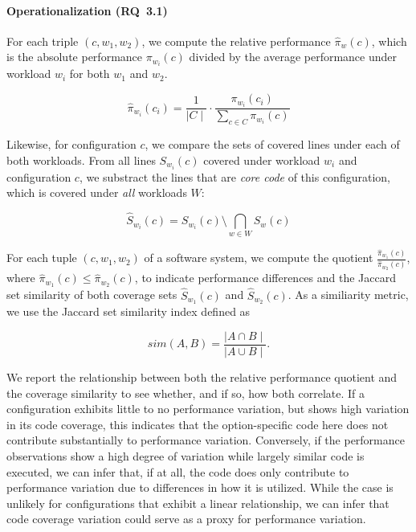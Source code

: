 

\paragraph*{Operationalization (RQ~3.1)} For each triple $(c, w_1, w_2)$, we compute the relative performance $\hat{\pi}_{w}(c)$, which is the absolute performance $\pi_{w_i}(c)$ divided by the average performance under workload $w_i$ for both $w_1$ and $w_2$. 

\begin{equation}
	\hat{\pi}_{w_i}(c_i) =  \frac{1}{\mid C \mid} \cdot \frac{\pi_{w_i}(c_i)}{\sum_{c\in C} \pi_{w_i}(c)}
\end{equation}

Likewise, for configuration $c$, we compare the sets of covered lines under each of both workloads. From all lines $S_{w_i}(c)$ covered under workload $w_i$ and configuration $c$, we substract the lines that are \emph{core code} of this configuration, which is covered under \emph{all} workloads $W$:

\begin{equation}
\hat{S}_{w_i}(c)	 = S_{w_i}(c) \setminus \bigcap_{w\in W} S_{w}(c)
\end{equation}

For each tuple $(c, w_1, w_2)$ of a software system, we compute the quotient 
$\frac{\hat{\pi}_{w_1}(c) }{ \hat{\pi}_{w_2}(c) }$, where $\hat{\pi}_{w_1}(c) \leq \hat{\pi}_{w_2}(c)$, to indicate performance differences and the Jaccard set similarity of both coverage sets $\hat{S}_{w_1}(c)$ and $\hat{S}_{w_2}(c)$. As a similiarity metric, we use the Jaccard set similarity index defined as

\begin{equation}
	sim (A, B) = \frac{\mid A \cap B\mid}{\mid A\cup B \mid}.
\end{equation} 

We report the relationship between both the relative performance quotient and the coverage similarity to see whether, and if so, how both correlate. If a configuration exhibits little to no performance variation, but shows high variation in its code coverage, this indicates that the option-specific code here does not contribute substantially to performance variation. Conversely, if the performance observations show a high degree of variation while largely similar code is executed, we can infer that, if at all, the code does only contribute to performance variation due to differences in how it is utilized. While the case is unlikely for configurations that exhibit a linear relationship, we can infer that code coverage variation could serve as a proxy for performance variation. 

